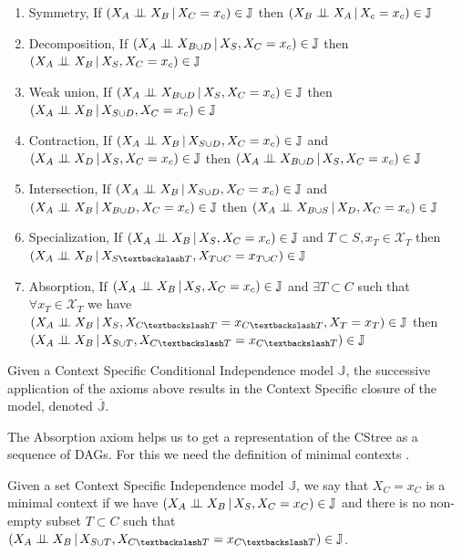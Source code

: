 \documentclass{tufte-book}
\begin{document}
\begin{Definition}
\begin{enumerate}
\item Symmetry, If \((X_A \perp \!\!\! \perp X_B \,|\, X_C=x_c) \in \mathbb{J}\) then \((X_B \perp \!\!\! \perp X_A \,|\, X_c=x_c) \in \mathbb{J}\)
\item Decomposition, If \((X_A \perp \!\!\! \perp X_{B \cup D} \,|\, X_S, X_C=x_c) \in \mathbb{J}\) then \((X_A \perp \!\!\! \perp X_B \,|\, X_S, X_C=x_c) \in \mathbb{J}\)
\item Weak union, If \((X_A \perp \!\!\! \perp X_{B \cup D} \,|\, X_S, X_C=x_c) \in \mathbb{J}\) then \((X_A \perp \!\!\! \perp X_{B} \,|\, X_{S \cup D}, X_C=x_c) \in \mathbb{J}\)
\item Contraction, If \((X_A \perp \!\!\! \perp X_B \,|\, X_{S \cup D}, X_C=x_c) \in \mathbb{J}\) and \((X_A \perp \!\!\! \perp X_D \,|\,X_S, X_C=x_c) \in \mathbb{J}\) then \((X_A \perp \!\!\! \perp X_{B \cup D} \,|\, X_S, X_C=x_c) \in \mathbb{J}\)
\item Intersection,  If \((X_A \perp \!\!\! \perp X_B \,|\, X_{S \cup D}, X_C=x_c) \in \mathbb{J}\) and  \((X_A \perp \!\!\! \perp X_B \,|\, X_{B \cup D}, X_C=x_c) \in \mathbb{J}\) then  \((X_A \perp \!\!\! \perp X_{B \cup S} \,|\, X_D, X_C=x_c) \in \mathbb{J}\)
\item Specialization, If \((X_A \perp \!\!\! \perp X_B \,|\, X_S, X_C=x_c) \in \mathbb{J}\) and \(T \subset S, x_T \in \mathcal{X}_T\) then \((X_A \indep X_B \,|\, X_{S \textbackslash T}, X_{T \cup C} = x_{T \cup C}) \in \mathbb{J}\)
\item Absorption, If \((X_A \perp \!\!\! \perp X_B \,|\, X_S, X_C=x_c) \in \mathbb{J}\) and \(\exists T \subset C\) such that \(\forall x_T \in \mathcal{X}_T\) we have \((X_A \indep X_B \,|\, X_S, X_{C\textbackslash T}=x_{C \textbackslash T}, X_T=x_T) \in \mathbb{J}\) then \((X_A \indep X_B \,|\, X_{S \cup T}, X_{C \textbackslash T}=x_{C \textbackslash T}) \in \mathbb{J}\)
\end{enumerate}


Given a Context Specific Conditional Independence model \(\mathbb{J}\), the successive application of the axioms above results in the Context Specific closure  of the model, denoted \(\mathbb{\overline{J}}\).


The Absorption axiom helps us to get a representation of the CStree as a sequence of DAGs. For this we need the definition of minimal contexts \cite{duarte-2021-repres-learn}.
\begin{definition}\label{def:mcs}
Given a set Context Specific Independence model $\mathbb{J}$, we say that ${X_C=x_C}$ is a minimal context if we have $(X_A  \perp \!\!\! \perp X_B \,|\, X_S, X_C=x_C) \in \mathbb{J}$ and there is no non-empty subset $T \subset C$ such that $(X_A \indep X_B \,|\, X_{S \cup T}, X_{C \textbackslash T}=x_{C\textbackslash T}) \in \mathbb{J}$.
\end{definition}


\end{Definition}
\end{document}
